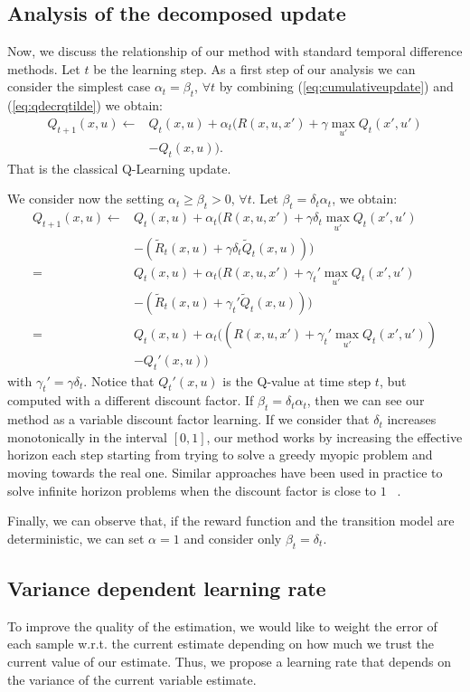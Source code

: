 \subsection{Analysis of the decomposed update}
Now, we discuss the relationship of our method with standard temporal difference methods. Let $t$ be the learning step. As a first step of our analysis we can consider the simplest case $\alpha_t=\beta_t$, $\forall t$ by combining (\ref{eq:cumulativeupdate}) and (\ref{eq:qdecrqtilde}) we obtain:
\begin{align}
Q_{t+1}(x,u) \leftarrow & Q_t(x,u)+\alpha_t(R(x,u,x')+\gamma\max_{u'}Q_t(x',u')\nonumber\\
 & - Q_t(x,u)).
\end{align}
That is the classical Q-Learning update. 

We consider now the setting $\alpha_t\geq\beta_t>0$, $\forall t$. Let $\beta_t=\delta_t\alpha_t$, we obtain:
\begin{align}
Q_{t+1}(x,u) \leftarrow & Q_t(x,u)+\alpha_t(R(x,u,x')+\gamma\delta_t \max_{u'}Q_t(x',u') \nonumber\\
  & -(\tilde{R}_t(x,u)+\gamma\delta_t\tilde{Q}_t(x,u))) \nonumber\\
= & Q_t(x,u)+\alpha_t(R(x,u,x')+\gamma_t'\max_{u'}Q_t(x',u') \nonumber\\
  & -(\tilde{R}_t(x,u)+\gamma_t'\tilde{Q}_t(x,u))) \nonumber\\
= & Q_t(x,u)+\alpha_t((R(x,u,x')+\gamma_t'\max_{u'}Q_t(x',u')) \nonumber\\
  & - Q_t'(x,u))
\end{align}
with $\gamma_t'=\gamma\delta_t$. Notice that $Q_t'(x,u)$ is the Q-value at time step $t$, but computed with a different discount factor. If $\beta_t=\delta_t\alpha_t$, then we can see our method as a variable discount factor learning. If we consider that $\delta_t$ increases monotonically in the interval $[0,1]$, our method works by increasing the effective horizon each step starting from trying to solve a greedy myopic problem and moving towards the real one.
Similar approaches have been used in practice to solve infinite horizon problems when the discount factor is close to $1$ ~\cite{crites1996improving, bao2008infinite, franccois2015discount}.

Finally, we can observe that, if the reward function and the transition model are deterministic, we can set $\alpha=1$ and consider only $\beta_t=\delta_t$.

\subsection{Variance dependent learning rate}
To improve the quality of the estimation, we would like to weight the error of each sample w.r.t. the current estimate depending on how much we trust the current value of our estimate. Thus, we propose a learning rate that depends on the variance of the current variable estimate.

